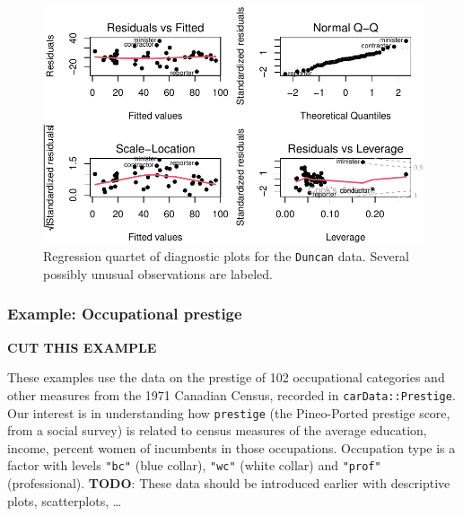 \documentclass[
  letterpaper,
  10pt,
  krantz2]{krantz}
\begin{document}
\begin{figure}[H]

{\centering \includegraphics[width=1\textwidth,height=\textheight]{figs/fig-duncan-plot-model-1.pdf}

}

\caption{\label{fig-duncan-plot-model}Regression quartet of diagnostic
plots for the \texttt{Duncan} data. Several possibly unusual
observations are labeled.}

\end{figure}

\hypertarget{example-occupational-prestige}{%
\subsubsection*{Example: Occupational
prestige}\label{example-occupational-prestige}}

\textbf{CUT THIS EXAMPLE}

These examples use the data on the prestige of 102 occupational
categories and other measures from the 1971 Canadian Census, recorded in
\texttt{carData::Prestige}. Our interest is in understanding how
\texttt{prestige} (the Pineo-Ported prestige score, from a social
survey) is related to census measures of the average education, income,
percent women of incumbents in those occupations. Occupation type is a
factor with levels \texttt{"bc"} (blue collar), \texttt{"wc"} (white
collar) and \texttt{"prof"} (professional). \textbf{TODO}: These data
should be introduced earlier with descriptive plots, scatterplots,
\ldots{}
\end{document}
